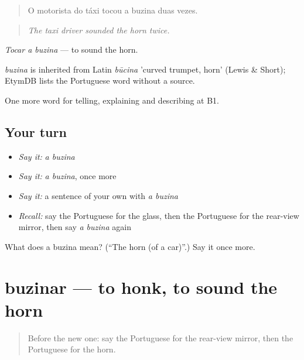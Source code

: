 \begin{quote}
O motorista do táxi tocou a buzina duas vezes.
\end{quote}

\begin{quote}
\emph{The taxi driver sounded the horn twice.}
\end{quote}

\emph{Tocar a buzina} — to sound the horn.

\begin{cousinweb}
\emph{buzina} is inherited from Latin \emph{būcina} 'curved trumpet, horn' (Lewis \& Short); EtymDB lists the Portuguese word without a source.
\end{cousinweb}

\begin{grammarlens}[title={What you've built}]
One more word for telling, explaining and describing at B1.
\end{grammarlens}

\subsection*{Your turn}
\begin{itemize}
\raggedright
  \item \emph{Say it:} \emph{a buzina}
  \item \emph{Say it:} \emph{a buzina}, once more
  \item \emph{Say it:} a sentence of your own with \emph{a buzina}
  \item \emph{Recall:} say the Portuguese for the glass, then the Portuguese for the rear-view mirror, then say \emph{a buzina} again
\end{itemize}

\begin{tcolorbox}[breakable,colback=teal!4,colframe=teal!35!black,title={Before you move on}]
What does a buzina mean? (\textquotedblleft{}The horn (of a car)\textquotedblright{}.) Say it once more.
\end{tcolorbox}
\section[buzinar]{buzinar — to honk, to sound the horn}

\label{lesson:PT-C403-buzinar}



\begin{quote}
Before the new one: say the Portuguese for the rear-view mirror, then the Portuguese for the horn.
\end{quote}

